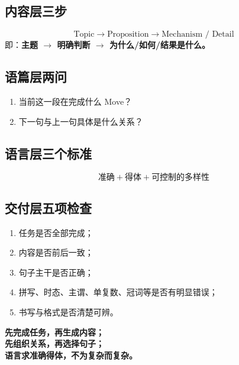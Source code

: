 \documentclass[11pt,a4paper]{ctexart}
\newcommand{\kw}[1]{\textbf{#1}}
\begin{document}
\subsection{内容层三步}
\[
\boxed{
\text{Topic}
\rightarrow
\text{Proposition}
\rightarrow
\text{Mechanism / Detail}
}
\]
即：\kw{主题 $\rightarrow$ 明确判断 $\rightarrow$ 为什么/如何/结果是什么。}

\subsection{语篇层两问}
\begin{enumerate}
  \item 当前这一段在完成什么 Move？
  \item 下一句与上一句具体是什么关系？
\end{enumerate}

\subsection{语言层三个标准}
\[
\boxed{
\text{准确}
+
\text{得体}
+
\text{可控制的多样性}
}
\]

\subsection{交付层五项检查}
\begin{enumerate}
  \item 任务是否全部完成；
  \item 内容是否前后一致；
  \item 句子主干是否正确；
  \item 拼写、时态、主谓、单复数、冠词等是否有明显错误；
  \item 书写与格式是否清楚可辨。
\end{enumerate}

\begin{exam}[考场总口令]
\centering
\Large\bfseries
先完成任务，再生成内容；\\
先组织关系，再选择句子；\\
语言求准确得体，不为复杂而复杂。
\end{exam}
\end{document}

